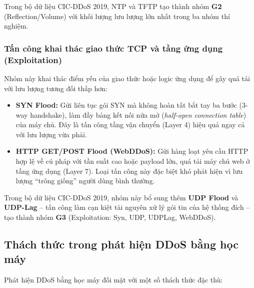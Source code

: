 Trong bộ dữ liệu CIC-DDoS 2019, NTP và TFTP tạo thành nhóm \textbf{G2} (Reflection/Volume) với khối lượng lưu lượng lớn nhất trong ba nhóm thí nghiệm.

\subsubsection{Tấn công khai thác giao thức TCP và tầng ứng dụng (Exploitation)}

Nhóm này khai thác điểm yếu của giao thức hoặc logic ứng dụng để gây quá tải với lưu lượng tương đối thấp hơn:
\begin{itemize}
    \item \textbf{SYN Flood:} Gửi liên tục gói SYN mà không hoàn tất bắt tay ba bước (3-way handshake), làm đầy bảng kết nối nửa mở (\textit{half-open connection table}) của máy chủ. Đây là tấn công tầng vận chuyển (Layer 4) hiệu quả ngay cả với lưu lượng vừa phải.
    \item \textbf{HTTP GET/POST Flood (WebDDoS):} Gửi hàng loạt yêu cầu HTTP hợp lệ về cú pháp với tần suất cao hoặc payload lớn, quá tải máy chủ web ở tầng ứng dụng (Layer 7). Loại tấn công này đặc biệt khó phát hiện vì lưu lượng ``trông giống'' người dùng bình thường.
\end{itemize}

Trong bộ dữ liệu CIC-DDoS 2019, nhóm này bổ sung thêm \textbf{UDP Flood} và \textbf{UDP-Lag} -- tấn công làm cạn kiệt tài nguyên xử lý gói tin của hệ thống đích -- tạo thành nhóm \textbf{G3} (Exploitation: Syn, UDP, UDPLag, WebDDoS).

\subsection{Thách thức trong phát hiện DDoS bằng học máy}

Phát hiện DDoS bằng học máy đối mặt với một số thách thức đặc thù:

